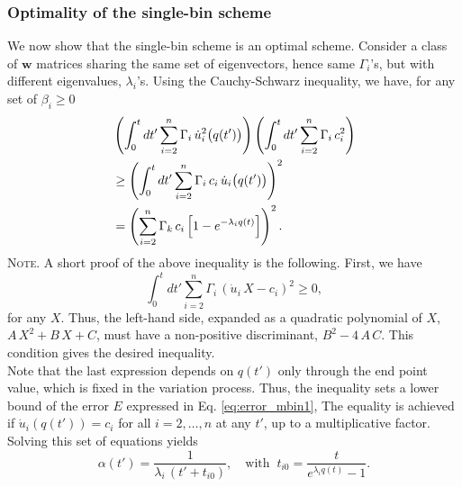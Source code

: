 \documentclass[reprint]{revtex4-1}
\newcommand{\note}[1]{{\color{DarkGreen}\footnotesize \textsc{Note.} #1}}
\newcommand{\Err}{E}
\begin{document}
%
%



\subsubsection{\label{sec:optWL}
Optimality of the single-bin scheme}



We now show
that the single-bin scheme
is an optimal scheme.
%
Consider a class of $\mathbf w$ matrices
sharing the same set of eigenvectors,
hence same $\Gamma_i$'s,
but with different eigenvalues, $\lambda_i$'s.
%
Using the Cauchy-Schwarz inequality, we have,
for any set of $\beta_i \ge 0$
%
\begin{align}
&
\left(
  \int_0^t dt'
    \sum_{i = 2}^n
      \Gamma_i \, \dot u_i^2\bigl( q(t') \bigr)
\right)
%
\left(
  \int_0^t dt'
    \sum_{i = 2}^n
      \Gamma_i \, c_i^2
\right)
%
\notag
\\
&
\ge
\left(
  \int_0^t dt'
    \sum_{i = 2}^n
      \Gamma_i \, c_i \, \dot u_i\bigl( q(t') \bigr)
\right)^2
\notag
\\
&
=
\left(
  \sum_{i = 2}^n \Gamma_k \, c_i
    \left[
      1 - e^{ -\lambda_i q(t) }
    \right]
\right)^2.
\notag
\end{align}
%
\note{A short proof of the above inequality
  is the following.
  First, we have
$$
\int_0^t
  dt' \sum_{i = 2}^n \Gamma_i \,
    \left( \dot u_i \, X - c_i \right)^2
\ge 0,
$$
  for any $X$.
  Thus, the left-hand side,
  expanded as a quadratic polynomial of $X$,
  $A \, X^2 + B \, X + C$,
  must have a non-positive discriminant,
  $B^2 - 4 \, A \, C$.
  This condition gives the desired inequality.
  \\%
}
%
Note that the last expression depends on
$q(t')$ only through the end point value,
which is fixed in the variation process.
%
Thus, the inequality sets a lower bound
of the error $\Err$
expressed in Eq. \eqref{eq:error_mbin1},
%
The equality is achieved
if $\dot u_i\left( q(t') \right) = c_i$
for all $i = 2, \dots, n$ at any $t'$,
up to a multiplicative factor.
%
Solving this set of equations yields
$$
\alpha(t') = \frac{              1              }
                  { \lambda_i \, (t' + t_{i0} ) },
\quad
\mathrm{with\;\;}
t_{i0} = \frac{             t            }
              { e^{ \lambda_i q(t) } - 1 }.
$$
\end{document}
